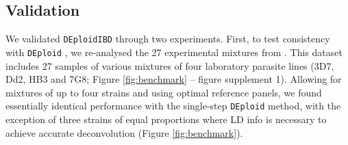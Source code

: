 \documentclass[9pt,lineno]{elife}
\begin{document}
\begin{figure}[ht]
\begin{center}
   \caption{}\label{fig:fig_unnumberd}
   \end{center}
\end{figure}


\subsection{Validation}

We validated \texttt{DEploidIBD} through two experiments.  First, to test consistency with \texttt{DEploid} \citet{Zhu2017}, we re-analysed the 27 experimental mixtures from \citep{Wendler2015}.  This dataset includes 27 samples of various mixtures of four laboratory parasite lines (3D7, Dd2, HB3 and 7G8; Figure \ref{fig:benchmark} – figure supplement 1).  Allowing for mixtures of up to four strains and using optimal reference panels, we found essentially identical performance with the single-step \texttt{DEploid} method, with the exception of three strains of equal proportions where LD info is necessary to achieve accurate deconvolution (Figure \ref{fig:benchmark}).
\end{document}
